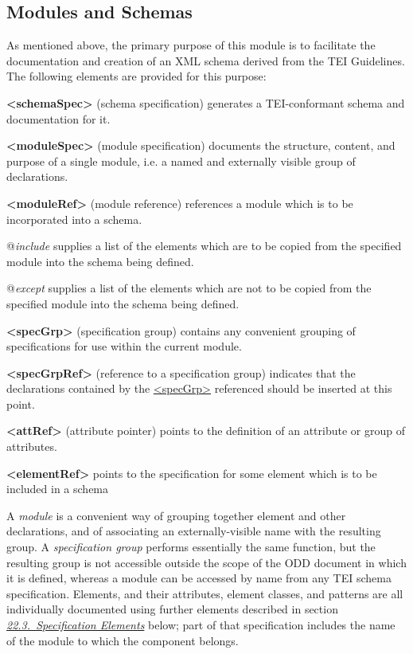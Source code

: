 \subsection[{Modules and Schemas}]{Modules and Schemas}\label{TDmodules}\par
As mentioned above, the primary purpose of this module is to facilitate the documentation and creation of an XML schema derived from the TEI Guidelines. The following elements are provided for this purpose: 
\begin{sansreflist}
  
\item [\textbf{<schemaSpec>}] (schema specification) generates a TEI-conformant schema and documentation for it.
\item [\textbf{<moduleSpec>}] (module specification) documents the structure, content, and purpose of a single module, i.e. a named and externally visible group of declarations.
\item [\textbf{<moduleRef>}] (module reference) references a module which is to be incorporated into a schema.\hfil\\[-10pt]\begin{sansreflist}
    \item[@{\itshape include}]
  supplies a list of the elements which are to be copied from the specified module into the schema being defined.
    \item[@{\itshape except}]
  supplies a list of the elements which are not to be copied from the specified module into the schema being defined.
\end{sansreflist}  
\item [\textbf{<specGrp>}] (specification group) contains any convenient grouping of specifications for use within the current module.
\item [\textbf{<specGrpRef>}] (reference to a specification group) indicates that the declarations contained by the \hyperref[TEI.specGrp]{<specGrp>} referenced should be inserted at this point.
\item [\textbf{<attRef>}] (attribute pointer) points to the definition of an attribute or group of attributes.
\item [\textbf{<elementRef>}] points to the specification for some element which is to be included in a schema
\end{sansreflist}
  A \textit{module} is a convenient way of grouping together element and other declarations, and of associating an externally-visible name with the resulting group. A \textit{specification group} performs essentially the same function, but the resulting group is not accessible outside the scope of the ODD document in which it is defined, whereas a module can be accessed by name from any TEI schema specification. Elements, and their attributes, element classes, and patterns are all individually documented using further elements described in section \textit{\hyperref[TDcrystals]{22.3.\ Specification Elements}} below; part of that specification includes the name of the module to which the component belongs.\par
